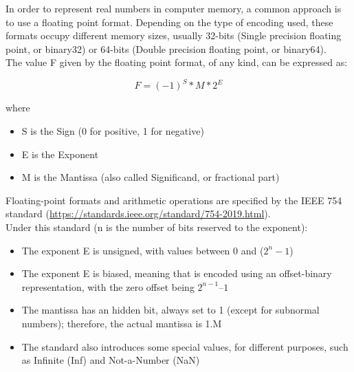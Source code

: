 In order to represent real numbers in computer memory, a common approach is to use a floating point format. Depending on the type of encoding used, these formats occupy different memory sizes, usually 32-bits (Single precision floating point, or binary32) or 64-bits (Double precision floating point, or binary64). \\
The value F given by the floating point format, of any kind, can be expressed as:

$$F = (-1)^{S}*M*2^{E} $$

where 
\begin{itemize}
	\item S is the Sign (0 for positive, 1 for negative)
	\item E is the Exponent
	\item M is the Mantissa (also called Significand, or fractional part)
\end{itemize}

Floating-point formats and arithmetic operations are specified by the IEEE 754 standard (\url{https://standards.ieee.org/standard/754-2019.html}). \\
Under this standard (n is the number of bits reserved to the exponent):
\begin{itemize}
	\item The exponent E is unsigned, with values between 0 and ($2^{n} -1$)
	\item	The exponent E is biased, meaning that is encoded using an offset-binary representation, with the zero offset being 			$2^{n-1} – 1$
	\item	The mantissa has an hidden bit, always set to 1 (except for subnormal numbers); therefore, the actual mantissa is 1.M
	\item	The standard also introduces some special values, for different purposes, such as Infinite (Inf) and Not-a-Number (NaN)
\end{itemize}

